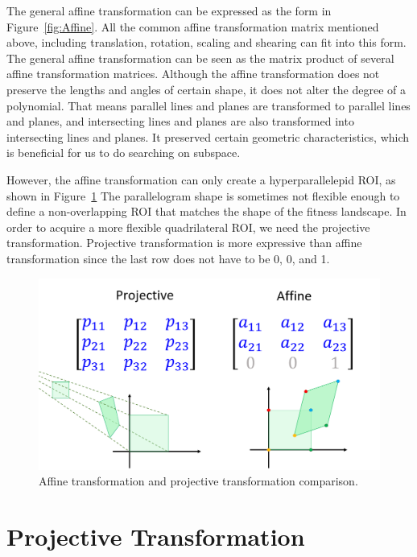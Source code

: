 The general affine transformation can be expressed as the form in Figure~\ref{fig:Affine}.
All the common affine transformation matrix mentioned above, including translation, rotation, scaling and shearing can fit into this form.
The general affine transformation can be seen as the matrix product of several affine transformation matrices.
Although the affine transformation does not preserve the lengths and angles of certain shape, it does not alter the degree of a polynomial.
That means parallel lines and planes are transformed to parallel lines and planes, 
and intersecting lines and planes are also transformed into intersecting lines and planes.
It preserved certain geometric characteristics, which is beneficial for us to do searching on subspace.


However, the affine transformation can only create a hyperparallelepid ROI, as shown in Figure~\ref{fig:Affine_vs_Projective}
The parallelogram shape is sometimes not flexible enough to define a non-overlapping ROI that matches the shape of the fitness landscape.
In order to acquire a more flexible quadrilateral ROI, we need the projective transformation.
Projective transformation is more expressive than affine transformation since the last row does not have to be 0, 0, and 1.

\begin{figure}
\centering
\includegraphics[width=\textwidth]{Affine_vs_Projective}
\caption{Affine transformation and projective transformation comparison.}\label{fig:Affine_vs_Projective}
\end{figure} 


\section{Projective Transformation}

